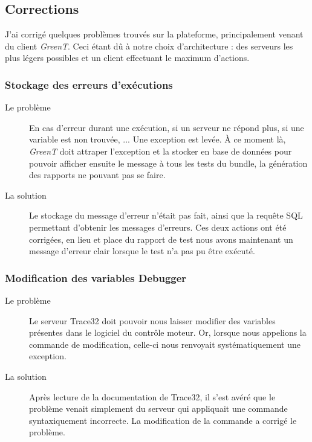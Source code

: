 \subsection{Corrections}
J'ai corrigé quelques problèmes trouvés sur la plateforme, principalement venant du client \textit{GreenT}. Ceci étant dû à notre choix d'architecture : des serveurs les plus légers possibles et un client effectuant le maximum d'actions.
	\subsubsection{Stockage des erreurs d'exécutions}
	\begin{description}
		\item[Le problème] En cas d'erreur durant une exécution, si un serveur ne répond plus, si une variable est non trouvée, ... Une exception est levée. À ce moment là, \textit{GreenT} doit attraper l'exception et la stocker en base de données pour pouvoir afficher ensuite le message à tous les tests du bundle, la génération des rapports ne pouvant pas se faire.
		\item[La solution] Le stockage du message d'erreur n'était pas fait, ainsi que la requête SQL permettant d'obtenir les messages d'erreurs. Ces deux actions ont été corrigées, en lieu et place du rapport de test nous avons maintenant un message d'erreur clair lorsque le test n'a pas pu être exécuté.
		\end{description}
		
	\subsubsection{Modification des variables Debugger}
		\begin{description}
			\item[Le problème] Le serveur Trace32 doit pouvoir nous laisser modifier des variables présentes dans le logiciel du contrôle moteur. Or, lorsque nous appelions la commande de modification, celle-ci nous renvoyait systématiquement une exception.
			\item[La solution] Après lecture de la documentation de Trace32, il s'est avéré que le problème venait simplement du serveur qui appliquait une commande syntaxiquement incorrecte. La modification de la commande a corrigé le problème.
	\end{description}
	
